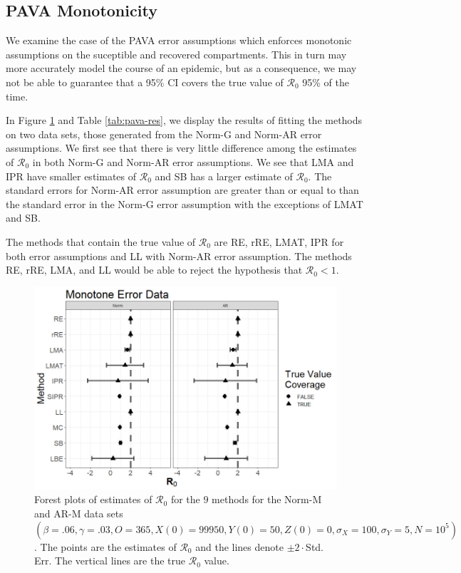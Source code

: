 \documentclass[12pt]{article}
\newcommand{\xxsir}{\ensuremath{9} } %
\newcommand{\rr}{\ensuremath{\mathcal{R}_0}}
\begin{document}
\subsection{PAVA Monotonicity}\label{sec:res-PAVA}
We examine the case of the PAVA error assumptions which enforces monotonic assumptions on the suceptible and recovered compartments.  This in turn may more accurately model the course of an epidemic, but as a consequence, we may not be able to guarantee that a 95\% CI covers the true value of $\rr$ 95\% of the time.

In Figure \ref{fig:pava-res} and Table \ref{tab:pava-res}, we display the results of fitting the methods on two data sets, those generated from the Norm-G and Norm-AR error assumptions.  We first see that there is very little difference among the estimates of $\rr$ in both Norm-G and Norm-AR error assumptions.  We see that LMA and IPR have smaller estimates of $\rr$ and SB has a larger estimate of $\rr$.  The standard errors for Norm-AR error assumption are greater than or equal to than the standard error in the Norm-G error assumption with the exceptions of LMAT and SB.

The methods that contain the true value of $\rr$ are RE, rRE, LMAT, IPR for both error assumptions and LL with Norm-AR error assumption.  The methods RE, rRE, LMA, and LL would be able to reject the hypothesis that $\rr < 1$.

\begin{figure}[H]
	\centering
	\includegraphics[scale=0.5]{images/mono.jpg}
	\caption{Forest plots of estimates of $\rr$ for the \xxsir methods for the Norm-M and AR-M data sets $(\beta=.06, \gamma=.03, O=365, X(0)=99950, Y(0)=50, Z(0)=0, \sigma_X=100, \sigma_Y=5, N=10^5)$.  The points are the estimates of $\rr$ and the lines denote $\pm 2\cdot $Std. Err.  The vertical lines are the true $\rr$ value.}
	\label{fig:pava-res}
\end{figure}
\end{document}
